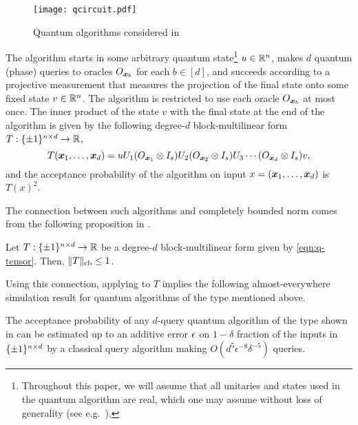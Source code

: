 \begin{figure}[h]
    \centering
    \texttt{[image: qcircuit.pdf]}
    \caption{\footnotesize Quantum algorithms considered in }
    \label{fig:quantum}
\end{figure}

The algorithm starts in some arbitrary quantum state\footnote{Throughout this paper, we will assume that all unitaries and states used in the quantum algorithm are real, which one may assume without loss of generality (see e.g.\ \cite{adh:qcomputability}).} $u \in {\mathbb R}^{n}$, makes $d$ quantum (phase) queries to oracles $O_{\boldsymbol{x}_b}$ for each $b \in [d]$, and succeeds according to a projective measurement that measures the projection of the final state onto some fixed state $v \in {\mathbb R}^n$. The algorithm is restricted to use each oracle $O_{\boldsymbol{x}_b}$ at most once. The inner product of the state $v$ with the final state at the end of the algorithm is given by the following degree-$d$ block-multilinear form $T : \{\pm 1\}^{n \times d} \to {\mathbb R}$, 
\begin{equation}\label{eqn:q-tensor}
    T(\boldsymbol{x}_1,\ldots, \boldsymbol{x}_d) = u U_1(O_{\boldsymbol{x}_1} \otimes I_s)U_2 (O_{\boldsymbol{x}_2} \otimes I_s)U_3 \cdots (O_{\boldsymbol{x}_d} \otimes I_s) v,
\end{equation}
and the acceptance probability of the algorithm on input $x = (\boldsymbol{x}_1, \ldots, \boldsymbol{x}_d)$ is $T(x)^2$. 

The connection between such algorithms and completely bounded norm comes from the following  proposition in \cite{ABP18}.

\begin{proposition}
    Let $T : \{\pm 1\}^{n \times d} \to {\mathbb R}$ be a degree-$d$ block-multilinear form given by \eqref{eqn:q-tensor}. Then, $\|T\|_{\mathrm{cb}} \le 1$. 
\end{proposition}

Using this connection, applying  to $T$ implies the following almost-everywhere simulation result for quantum algorithms of the type mentioned above.

\begin{corollary}
     The acceptance probability of any $d$-query quantum algorithm of the type shown in  can be estimated up to an additive error $\epsilon$ on $1-\delta$ fraction of the inputs in $\{\pm 1\}^{n \times d}$ by a classical query algorithm making $O(d^5\epsilon^{-8}\delta^{-5})$ queries. 
\end{corollary}

